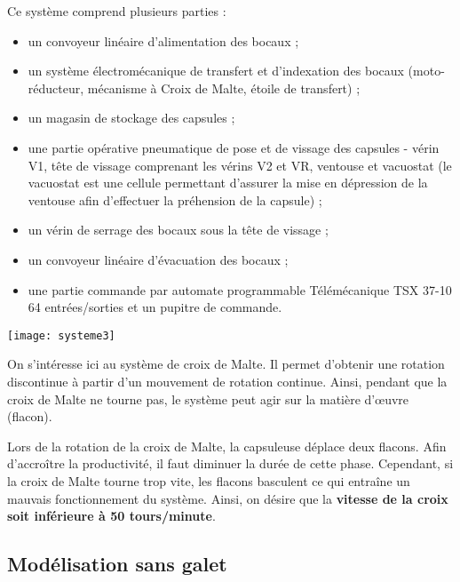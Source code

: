 \vspace{1cm}
\begin{minipage}[c]{.55\linewidth}
Ce système comprend plusieurs parties :
\begin{itemize}
\item un convoyeur linéaire d'alimentation des bocaux ;
\item un système électromécanique de transfert et d'indexation des bocaux (moto-réducteur, mécanisme à Croix de Malte, étoile de transfert) ;
\item un magasin de stockage des capsules ;
\item une partie opérative pneumatique de pose et de vissage des capsules - vérin V1, tête de vissage comprenant les vérins V2 et VR, ventouse et vacuostat (le vacuostat est une cellule permettant d'assurer la mise en dépression de la ventouse afin d'effectuer la préhension de la capsule) ;
\item un vérin de serrage des bocaux sous la tête de vissage ;
\item un convoyeur linéaire d'évacuation des bocaux ;
\item une partie commande par automate programmable Télémécanique TSX 37-10 64 entrées/sorties et un pupitre de commande.
\end{itemize}

\end{minipage} \hfill
\begin{minipage}[c]{.4\linewidth}
\begin{center}
 \texttt{[image: systeme3]}
\end{center}
\end{minipage}

\vspace{.5cm}

On s'intéresse ici au système de croix de Malte. Il permet d'obtenir une rotation discontinue à partir d'un mouvement de rotation continue. Ainsi, pendant que la croix de Malte ne tourne pas, le système peut agir sur la matière d'\oe{}uvre (flacon).

Lors de la rotation de la croix de Malte, la capsuleuse déplace deux flacons. Afin d'accroître la productivité, il faut diminuer la durée de cette phase. Cependant, si la croix de Malte tourne trop vite, les flacons basculent ce qui entraîne un mauvais fonctionnement du système. Ainsi, on désire que la \textbf{vitesse de la croix soit inférieure à 50 tours/minute}. 



\subsection*{Modélisation sans galet}

